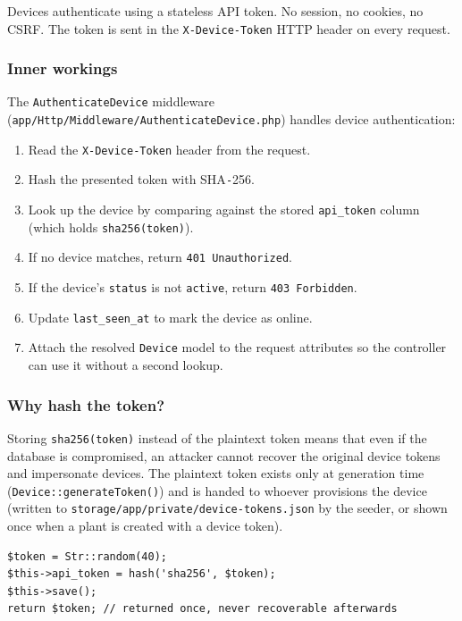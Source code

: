 \documentclass[11pt,a4paper]{article}
\begin{document}
Devices authenticate using a stateless API token. No session, no cookies, no CSRF. The token is sent in the \texttt{X-Device-Token} HTTP header on every request.

\subsubsection{Inner workings}

The \texttt{AuthenticateDevice} middleware (\texttt{app/Http/Middleware/AuthenticateDevice.php}) handles device authentication:

\begin{enumerate}[leftmargin=*]
    \item Read the \texttt{X-Device-Token} header from the request.
    \item Hash the presented token with SHA\texttt{-}256.
    \item Look up the device by comparing against the stored \texttt{api\_token} column (which holds \texttt{sha256(token)}).
    \item If no device matches, return \texttt{401 Unauthorized}.
    \item If the device's \texttt{status} is not \texttt{active}, return \texttt{403 Forbidden}.
    \item Update \texttt{last\_seen\_at} to mark the device as online.
    \item Attach the resolved \texttt{Device} model to the request attributes so the controller can use it without a second lookup.
\end{enumerate}

\subsubsection{Why hash the token?}

Storing \texttt{sha256(token)} instead of the plaintext token means that even if the database is compromised, an attacker cannot recover the original device tokens and impersonate devices. The plaintext token exists only at generation time (\texttt{Device::generateToken()}) and is handed to whoever provisions the device (written to \texttt{storage/app/private/device-tokens.json} by the seeder, or shown once when a plant is created with a device token).

\begin{lstlisting}[caption=Token generation in Device model]
$token = Str::random(40);
$this->api_token = hash('sha256', $token);
$this->save();
return $token; // returned once, never recoverable afterwards
\end{lstlisting}
\end{document}
